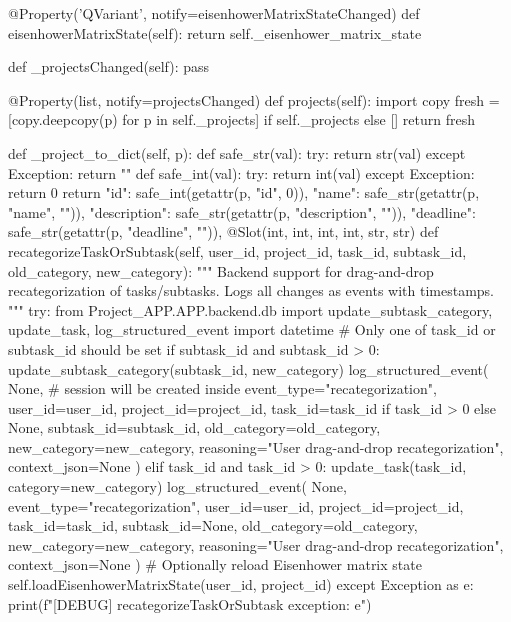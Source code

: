\documentclass{report}
\begin{document}
\begin{python}
    @Property('QVariant', notify=eisenhowerMatrixStateChanged)
    def eisenhowerMatrixState(self):
        return self._eisenhower_matrix_state

    def _projectsChanged(self):
        pass

    @Property(list, notify=projectsChanged)
    def projects(self):
        import copy
        fresh = [copy.deepcopy(p) for p in self._projects] if self._projects else []
        return fresh

    def _project_to_dict(self, p):
        def safe_str(val):
            try:
                return str(val)
            except Exception:
                return ""
        def safe_int(val):
            try:
                return int(val)
            except Exception:
                return 0
        return {
            "id": safe_int(getattr(p, "id", 0)),
            "name": safe_str(getattr(p, "name", "")),
            "description": safe_str(getattr(p, "description", "")),
            "deadline": safe_str(getattr(p, "deadline", "")),
        }
    @Slot(int, int, int, int, str, str)
    def recategorizeTaskOrSubtask(self, user_id, project_id, task_id, subtask_id, old_category, new_category):
        """
        Backend support for drag-and-drop recategorization of tasks/subtasks.
        Logs all changes as events with timestamps.
        """
        try:
            from Project_APP.APP.backend.db import update_subtask_category, update_task, log_structured_event
            import datetime
            # Only one of task_id or subtask_id should be set
            if subtask_id and subtask_id > 0:
                update_subtask_category(subtask_id, new_category)
                log_structured_event(
                    None,  # session will be created inside
                    event_type="recategorization",
                    user_id=user_id,
                    project_id=project_id,
                    task_id=task_id if task_id > 0 else None,
                    subtask_id=subtask_id,
                    old_category=old_category,
                    new_category=new_category,
                    reasoning="User drag-and-drop recategorization",
                    context_json=None
                )
            elif task_id and task_id > 0:
                update_task(task_id, category=new_category)
                log_structured_event(
                    None,
                    event_type="recategorization",
                    user_id=user_id,
                    project_id=project_id,
                    task_id=task_id,
                    subtask_id=None,
                    old_category=old_category,
                    new_category=new_category,
                    reasoning="User drag-and-drop recategorization",
                    context_json=None
                )
            # Optionally reload Eisenhower matrix state
            self.loadEisenhowerMatrixState(user_id, project_id)
        except Exception as e:
            print(f"[DEBUG] recategorizeTaskOrSubtask exception: {e}")


\end{python}
\end{document}

